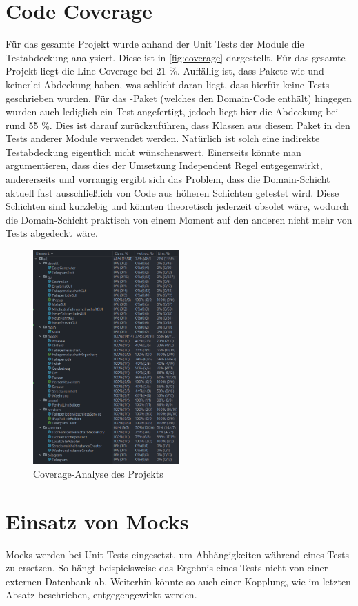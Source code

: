 \section{Code Coverage}
Für das gesamte Projekt wurde anhand der Unit Tests der Module die Testabdeckung analysiert.
Diese ist in \autoref{fig:coverage} dargestellt.
Für das gesamte Projekt liegt die Line-Coverage bei 21 \%.
Auffällig ist, dass Pakete wie  und  keinerlei Abdeckung haben, was schlicht daran liegt, dass hierfür keine Tests geschrieben wurden.
Für das -Paket (welches den Domain-Code enthält) hingegen wurden auch lediglich ein Test angefertigt, jedoch liegt hier die Abdeckung bei rund 55 \%.
Dies ist darauf zurückzuführen, dass Klassen aus diesem Paket in den Tests anderer Module verwendet werden.
Natürlich ist solch eine indirekte Testabdeckung eigentlich nicht wünschenswert.
Einerseits könnte man argumentieren, dass dies der Umsetzung Independent Regel entgegenwirkt, andererseits und vorrangig ergibt sich das Problem, dass die Domain-Schicht aktuell fast ausschließlich von Code aus höheren Schichten getestet wird.
Diese Schichten sind kurzlebig und könnten theoretisch jederzeit obsolet wäre, wodurch die Domain-Schicht praktisch von einem Moment auf den anderen nicht mehr von Tests abgedeckt wäre.

\begin{figure}[H]
    \centering
    \includegraphics[width=0.5\textwidth]{Bilder/Coverage.png}
    \caption{Coverage-Analyse des Projekts}
    \label{fig:coverage}
\end{figure}

\section{Einsatz von Mocks}
Mocks werden bei Unit Tests eingesetzt, um Abhängigkeiten während eines Tests zu ersetzen.
So hängt beispielsweise das Ergebnis eines Tests nicht von einer externen Datenbank ab.
Weiterhin könnte so auch einer Kopplung, wie im letzten Absatz beschrieben, entgegengewirkt werden.

